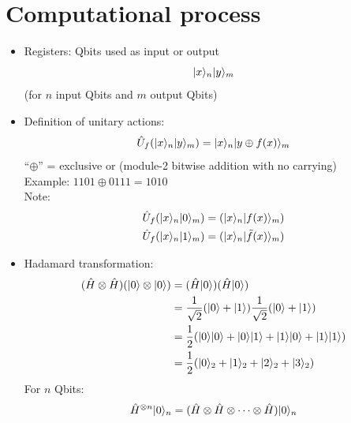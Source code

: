 \documentclass{../doc}
\begin{document}

  \section{Computational process}
    \begin{itemize}
      \item Registers: Qbits used as input or output
        \begin{equation}
          | x \rangle_n | y \rangle_m
        \end{equation}
        (for $n$ input Qbits and $m$ output Qbits)
      \item Definition of unitary actions:
        \begin{equation}
          \hat U_f (| x \rangle_n | y \rangle_m) = | x \rangle_n | y \oplus f(x) \rangle_m
        \end{equation}
        ``$\oplus$'' = exclusive or (module-2 bitwise addition with no carrying) \\
        Example: $1101 \oplus 0111 = 1010$ \\
        Note:
        \begin{align}
          \hat U_f (| x \rangle_n | 0 \rangle_m) &= (| x \rangle_n | f(x) \rangle_m) \\
          \hat U_f (| x \rangle_n | 1 \rangle_m) &= (| x \rangle_n | \tilde f(x) \rangle_m)
        \end{align}
      \item Hadamard transformation:
        \begin{align}
          (\hat H \otimes \hat H) (| 0 \rangle \otimes | 0 \rangle)
          &= (\hat H | 0 \rangle) (\hat H | 0 \rangle) \\
          &= \frac{1}{\sqrt{2}} (| 0 \rangle + | 1 \rangle) \frac{1}{\sqrt{2}} (| 0 \rangle + | 1 \rangle) \\
          &= \frac{1}{2} (| 0 \rangle| 0 \rangle + | 0 \rangle| 1 \rangle + | 1 \rangle| 0 \rangle + | 1 \rangle| 1 \rangle) \\
          &= \frac{1}{2} (| 0 \rangle_2 + | 1 \rangle_2 + | 2 \rangle_2 + | 3 \rangle_2)
        \end{align}
        For $n$ Qbits:
        \begin{align}
          \hat H^{\otimes n} \ket{0}_n
          &= (\hat H \otimes \hat H \otimes \dots \otimes \hat H) \ket{0}_n \\

\end{align}
\end{itemize}
\end{document}
